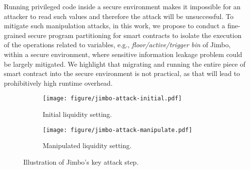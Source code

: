 Running privileged code inside a secure environment makes it impossible for an attacker to read such values and therefore the attack will be unsuccessful.
To mitigate such manipulation attacks, 
in this work, 
we propose to conduct a fine-grained secure program partitioning for smart contracts to isolate the execution of the operations related to \secrete variables, e.g., \textit{floor/active/trigger bin} of Jimbo, within a secure environment, where sensitive information leakage problem could be largely mitigated.  
We highlight that migrating and running the entire piece of smart contract into the secure environment is not practical, as that will lead to prohibitively high runtime overhead.

\begin{figure}[t]
    \begin{subfigure}[b]{0.48\columnwidth} %
        \centering
        \texttt{[image: figure/jimbo-attack-initial.pdf]} %
        \caption{Initial liquidity setting.}
        \label{fig:jimbo:initial}
    \end{subfigure}
    \hfill
    \begin{subfigure}[b]{0.48\columnwidth} %
        \centering
        \texttt{[image: figure/jimbo-attack-manipulate.pdf]} %
        \caption{Manipulated liquidity setting.}
        \label{fig:jimbo:manipulate}
    \end{subfigure}
    \caption{Illustration of Jimbo's key attack step.}
    \label{fig:mainfigure}
\end{figure}

